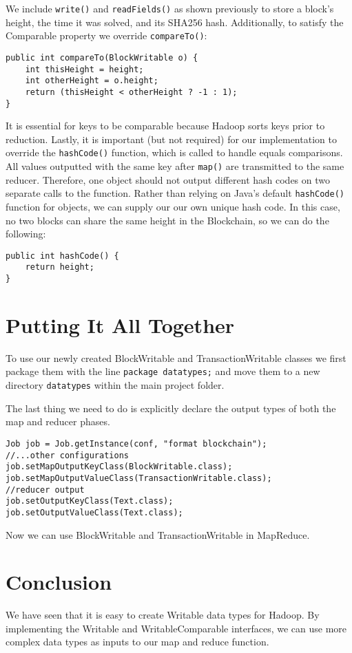 \documentclass[9pt,twocolumn,twoside]{idsi}
\begin{document}
We include \lstinline{write()} and \lstinline{readFields()} as shown previously to store a block's height, the time it was solved, and its SHA256 hash. Additionally, to satisfy the Comparable property we override \lstinline{compareTo()}:

\begin{lstlisting}
public int compareTo(BlockWritable o) {
    int thisHeight = height;
    int otherHeight = o.height;
    return (thisHeight < otherHeight ? -1 : 1);
}
\end{lstlisting}

It is essential for keys to be comparable because Hadoop sorts keys prior to reduction. Lastly, it is important (but not required) for our implementation to override the \lstinline{hashCode()} function, which is called to handle equals comparisons. All values outputted with the same key after \lstinline{map()} are transmitted to the same reducer. Therefore, one object should not output different hash codes on two separate calls to the function. Rather than relying on Java's default \lstinline{hashCode()} function for objects, we can supply our our own unique hash code. In this case, no two blocks can share the same height in the Blockchain, so we can do the following:

\begin{lstlisting}
public int hashCode() {
    return height;
}
\end{lstlisting}
\section{Putting It All Together}

To use our newly created BlockWritable and TransactionWritable classes we first package them with the line \lstinline{package datatypes;} and move them to a new directory \lstinline{datatypes} within the main project folder.

The last thing we need to do is explicitly declare the output types of both the map and reducer phases.

\begin{lstlisting}
Job job = Job.getInstance(conf, "format blockchain");
//...other configurations
job.setMapOutputKeyClass(BlockWritable.class);
job.setMapOutputValueClass(TransactionWritable.class);
//reducer output
job.setOutputKeyClass(Text.class);
job.setOutputValueClass(Text.class);
\end{lstlisting}

Now we can use BlockWritable and TransactionWritable in MapReduce.

\section{Conclusion}
We have seen that it is easy to create Writable data types for Hadoop. By implementing the Writable and WritableComparable interfaces, we can use more complex data types as inputs to our map and reduce function.
\end{document}
